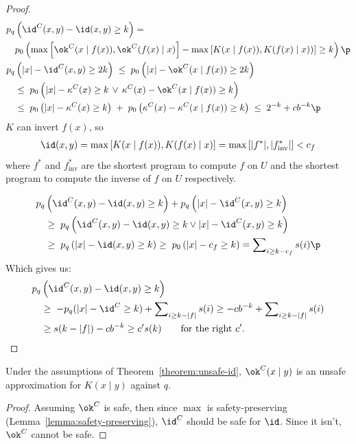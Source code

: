 \begin{proof}
\begin{align*} 
p_q&\left({\id}^C(x, y) - \id(x, y) \geq k \right) = \\
 &p_0\left(\max\left[\ok^C(x \mid f(x)), \ok^C(f(x)\mid x)\right] - \max\left[K(x\mid f(x)), K(f(x)\mid x))\right] \geq k\right) \p\\
p_q&\left(|x| - {\id}^C(x, y) \geq 2k\right) \;\leq\; p_0\left(|x| - \ok^C(x \mid f(x)) \geq 2k\right)\\
&\leq \;p_0\left(|x| - \kappa^C(x) \geq k \,\lor\, \kappa^C(x) - \ok^C(x \mid f(x)) \geq k\right)\\
&\leq \;p_0\left(|x| - \kappa^C(x) \geq k \right) \;+\; p_0\left(\kappa^C(x) - \kappa^C(x \mid f(x)) \geq k\right) \;\leq\; 2^{-k} + cb^{-k} \p
\end{align*}
$K$ can invert $f(x)$, so 
\begin{align*}
\id(x, y) = \max\left[K(x\mid f(x)), K(f(x)\mid x)\right] = \max\left[|f^*|, |f^*_{\text{inv}}|\right] < c_f\end
{align*}
where $f^*$ and $f^*_{\text{inv}}$ are the shortest program to compute $f$ on $U$ and the shortest program to compute the inverse of $f$ on $U$ respectively. 
 
\begin{align*}
p_q&\left({\id}^C(x,y) - \id(x,y) \geq k\right) + p_q\left(|x| - {\id}^C(x,y) \geq k\right)\\
&\geq\; p_q\left({\id}^C(x, y) - \id(x, y) \geq k \lor|x| - {\id}^C(x, y) \geq k\right)\\
&\geq\; p_q\left(|x| - \id(x, y) \geq k \right) \geq\; p_0\left(|x| - c_f \geq k\right) = \sum\nolimits_{i \geq k- c_f} s(i)\p
\end{align*}
Which gives us:\belowdisplayskip=-12pt
\begin{align*}
p_q&\left({\id}^C(x,y) - \id(x,y) \geq k\right) \\
&\geq \; - p_q(|x| - {\id}^C \geq k) + \sum\nolimits_{i \geq k- |f|} s(i) \geq- cb^{-k} + \sum\nolimits_{i \geq k- |f|} s(i) \\
& \geq s(k-|f|) - cb^{-k} \geq c's(k) \quad\quad\text{for the right  $c'$.}
\end{align*}
\end{proof}

\begin{corollary}
Under the assumptions of Theorem~\ref{theorem:unsafe-id}, $\ok^C(x\mid y)$ is an unsafe approximation for $K(x\mid y)$ against $q$. 
\end{corollary}
\begin{proof}
Assuming $\ok^C$ is safe, then since $\max$ is safety-preserving (Lemma~\ref{lemma:safety-preserving}), $\id^C$ should be safe for $\id$. Since it isn't, $\ok^C$ cannot be safe.
\end{proof}

